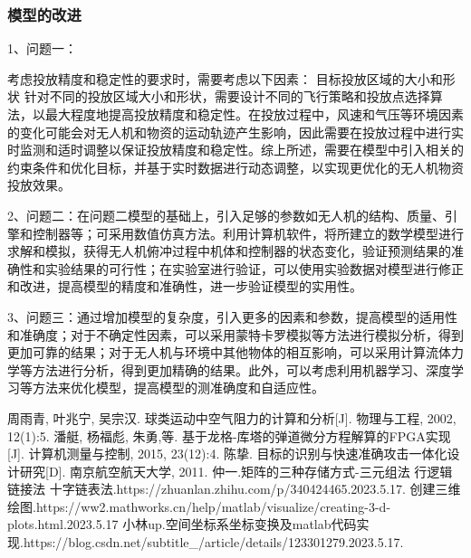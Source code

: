 \documentclass[normalsize]{ctexart}
\begin{document}
		\subsubsection{模型的改进}
		1、问题一：\par 考虑投放精度和稳定性的要求时，需要考虑以下因素：
		目标投放区域的大小和形状
		针对不同的投放区域大小和形状，需要设计不同的飞行策略和投放点选择算法，以最大程度地提高投放精度和稳定性。在投放过程中，风速和气压等环境因素的变化可能会对无人机和物资的运动轨迹产生影响，因此需要在投放过程中进行实时监测和适时调整以保证投放精度和稳定性。综上所述，需要在模型中引入相关的约束条件和优化目标，并基于实时数据进行动态调整，以实现更优化的无人机物资投放效果。
		\par 2、问题二：在问题二模型的基础上，引入足够的参数如无人机的结构、质量、引擎和控制器等；可采用数值仿真方法。利用计算机软件，将所建立的数学模型进行求解和模拟，获得无人机俯冲过程中机体和控制器的状态变化，验证预测结果的准确性和实验结果的可行性；在实验室进行验证，可以使用实验数据对模型进行修正和改进，提高模型的精度和准确性，进一步验证模型的实用性。
		\par 3、问题三：通过增加模型的复杂度，引入更多的因素和参数，提高模型的适用性和准确度；对于不确定性因素，可以采用蒙特卡罗模拟等方法进行模拟分析，得到更加可靠的结果；对于无人机与环境中其他物体的相互影响，可以采用计算流体力学等方法进行分析，得到更加精确的结果。此外，可以考虑利用机器学习、深度学习等方法来优化模型，提高模型的测准确度和自适应性。
		\newpage
		\begin{thebibliography}{99} 
			周雨青, 叶兆宁, 吴宗汉. 球类运动中空气阻力的计算和分析[J]. 物理与工程, 2002, 12(1):5.
			潘艇, 杨福彪, 朱勇,等. 基于龙格-库塔的弹道微分方程解算的FPGA实现[J]. 计算机测量与控制, 2015, 23(12):4.
			陈挚. 目标的识别与快速准确攻击一体化设计研究[D]. 南京航空航天大学, 2011.
			仲一.矩阵的三种存储方式-三元组法 行逻辑链接法 十字链表法.https://zhuanlan.zhihu.com/p/340424465.2023.5.17.
			创建三维绘图.https://ww2.mathworks.cn/help/matlab/visualize/creating-3-d-plots.html.2023.5.17
			小林up.空间坐标系坐标变换及matlab代码实现.https://blog.csdn.net/subtitle_/article/details/123301279.2023.5.17.
		\end{thebibliography}
		
		\newpage
\end{document}
